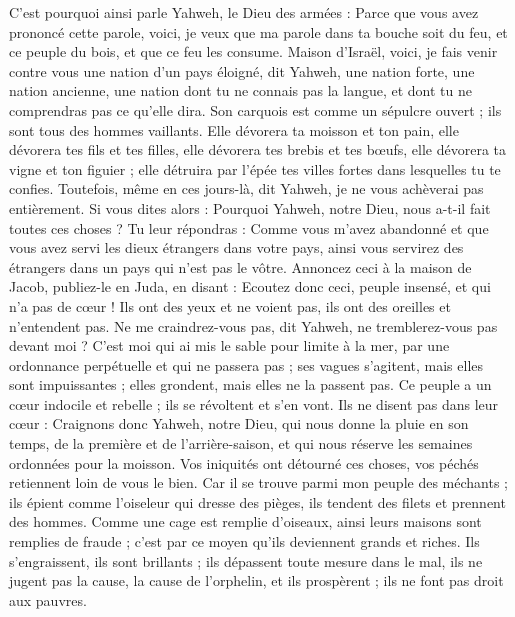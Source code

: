 \begin{multicols}{2}
C'est pourquoi ainsi parle Yahweh, le Dieu des armées : Parce que vous avez prononcé cette parole, voici, je veux que ma parole dans ta bouche soit du feu, et ce peuple du bois, et que ce feu les consume.
Maison d'Israël, voici, je fais venir contre vous une nation d'un pays éloigné, dit Yahweh, une nation forte, une nation ancienne, une nation dont tu ne connais pas la langue, et dont tu ne comprendras pas ce qu'elle dira.
Son carquois est comme un sépulcre ouvert ; ils sont tous des hommes vaillants.
Elle dévorera ta moisson et ton pain, elle dévorera tes fils et tes filles, elle dévorera tes brebis et tes bœufs, elle dévorera ta vigne et ton figuier ; elle détruira par l'épée tes villes fortes dans lesquelles tu te confies.
Toutefois, même en ces jours-là, dit Yahweh, je ne vous achèverai pas entièrement.
Si vous dites alors : Pourquoi Yahweh, notre Dieu, nous a-t-il fait toutes ces choses ? Tu leur répondras : Comme vous m'avez abandonné et que vous avez servi les dieux étrangers dans votre pays, ainsi vous servirez des étrangers dans un pays qui n'est pas le vôtre.
Annoncez ceci à la maison de Jacob, publiez-le en Juda, en disant :
Ecoutez donc ceci, peuple insensé, et qui n'a pas de cœur ! Ils ont des yeux et ne voient pas, ils ont des oreilles et n'entendent pas.
Ne me craindrez-vous pas, dit Yahweh, ne tremblerez-vous pas devant moi ? C'est moi qui ai mis le sable pour limite à la mer, par une ordonnance perpétuelle et qui ne passera pas ; ses vagues s'agitent, mais elles sont impuissantes ; elles grondent, mais elles ne la passent pas.
Ce peuple a un cœur indocile et rebelle ; ils se révoltent et s'en vont.
Ils ne disent pas dans leur cœur : Craignons donc Yahweh, notre Dieu, qui nous donne la pluie en son temps, de la première et de l'arrière-saison, et qui nous réserve les semaines ordonnées pour la moisson.
Vos iniquités ont détourné ces choses, vos péchés retiennent loin de vous le bien.
Car il se trouve parmi mon peuple des méchants ; ils épient comme l'oiseleur qui dresse des pièges, ils tendent des filets et prennent des hommes.
Comme une cage est remplie d'oiseaux, ainsi leurs maisons sont remplies de fraude ; c'est par ce moyen qu'ils deviennent grands et riches.
Ils s'engraissent, ils sont brillants ; ils dépassent toute mesure dans le mal, ils ne jugent pas la cause, la cause de l'orphelin, et ils prospèrent ; ils ne font pas droit aux pauvres.

\end{multicols}
